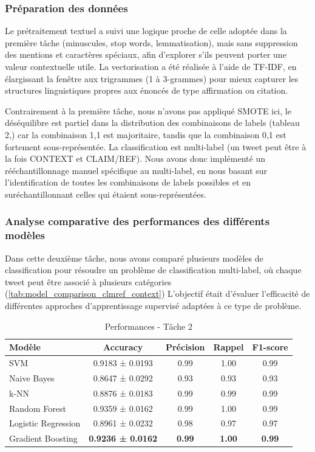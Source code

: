 \subsubsection{Préparation des données}
Le prétraitement textuel a suivi une logique proche de celle adoptée dans la première tâche (minuscules, stop words, lemmatisation), mais sans suppression des mentions et caractères spéciaux, afin d’explorer s’ils peuvent porter une valeur contextuelle utile.
La vectorisation a été réalisée à l’aide de TF-IDF, en élargissant la fenêtre aux trigrammes (1 à 3-grammes) pour mieux capturer les structures linguistiques propres aux énoncés de type affirmation ou citation.

Contrairement à la première tâche, nous n’avons pas appliqué SMOTE ici, le déséquilibre est partiel dans la distribution des combinaisons de labels (tableau 2,) car la combinaison {1,1} est majoritaire, tandis que la combinaison {0,1} est fortement sous-représentée.
La classification est multi-label (un tweet peut être à la fois CONTEXT et CLAIM/REF).
Nous avons donc implémenté un rééchantillonnage manuel spécifique au multi-label, en nous basant sur l’identification de toutes les combinaisons de labels possibles et en suréchantillonnant celles qui étaient sous-représentées.

\subsubsection{Analyse comparative des performances des différents modèles}
Dans cette deuxième tâche, nous avons comparé plusieurs modèles de classification pour résoudre un problème de classification multi-label, où chaque tweet peut être associé à plusieurs catégories (\autoref{tab:model_comparison_clmref_context})
L’objectif était d’évaluer l’efficacité de différentes approches d’apprentissage supervisé adaptées à ce type de problème.

\begin{table}[H]
    \centering
    \caption{Performances - Tâche 2}
    \begin{tabular}{lcccc}
        \toprule
        Modèle & Accuracy & Précision & Rappel & F1-score \\
        \midrule
        SVM & 0.9183 ± 0.0193 & 0.99 & 1.00 & 0.99 \\
        Naive Bayes & 0.8647 ± 0.0292 & 0.93 & 0.93 & 0.93 \\
        k-NN & 0.8876 ± 0.0183 & 0.99 & 0.99 & 0.99 \\
        Random Forest & 0.9359 ± 0.0162 & 0.99 & 1.00 & 0.99 \\
        Logistic Regression & 0.8961 ± 0.0232 & 0.98 & 0.97 & 0.97 \\
        Gradient Boosting & \textbf{0.9236 ± 0.0162} & \textbf{0.99} & \textbf{1.00} & \textbf{0.99} \\
        \bottomrule
    \end{tabular}\label{tab:model_comparison_clmref_context}
\end{table}

